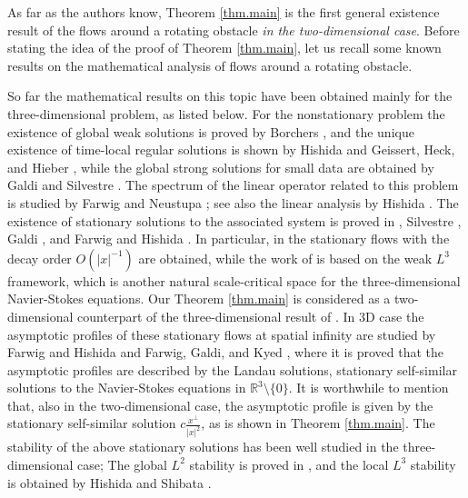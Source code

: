 \documentclass[11pt,a4paper]{article}
\newcommand{\R}{\mathbb{R}}
\begin{document}
As far as the authors know, Theorem \ref{thm.main} is the first general existence result of the flows around a rotating obstacle {\it in the two-dimensional case}.
Before stating the idea of the proof of Theorem \ref{thm.main}, 
let us recall some known results on the mathematical  analysis of flows around a rotating obstacle.


So far the mathematical results on this topic have been obtained mainly for the three-dimensional problem,
as listed below.
For the nonstationary problem the existence of global weak solutions is proved by Borchers \cite{Bo}, and the unique existence of time-local regular solutions is shown by Hishida \cite{H1} and Geissert, Heck, and Hieber \cite{GHH}, while the global strong solutions for small data are obtained by Galdi and Silvestre \cite{GSi}. The spectrum of the linear operator  related to this problem is studied by Farwig and Neustupa \cite{FN}; see also the linear analysis by Hishida \cite{H2}. The existence of stationary solutions to the associated system is proved in \cite{Bo}, Silvestre \cite{Si},  Galdi \cite{G1}, and Farwig and Hishida \cite{FH0}. In particular, in \cite{G1} the stationary flows with the decay order  $O(|x|^{-1})$ are obtained, while the work of \cite{FH0} is based on the weak $L^{3}$ framework, which is another natural scale-critical space for the three-dimensional Navier-Stokes equations. Our Theorem \ref{thm.main} is considered as a two-dimensional counterpart of the three-dimensional result of \cite{G1}.
In $3$D case the asymptotic profiles of these stationary flows at spatial infinity are studied by Farwig and Hishida \cite{FH1,FH2} and Farwig, Galdi, and Kyed \cite{FGK}, where it is proved that the asymptotic profiles are described by the Landau solutions, stationary self-similar solutions to the Navier-Stokes equations in 
$\R^3\setminus\{0\}$. 
It is worthwhile to mention that, also in the two-dimensional case,
the asymptotic profile is given by the stationary self-similar solution $c \frac{x^\bot}{|x|^2}$, 
as is shown in Theorem \ref{thm.main}.
The stability of the above stationary solutions has been well studied in the three-dimensional case;
The global $L^2$ stability is proved in \cite{GSi}, 
and the local $L^3$ stability is obtained by Hishida and Shibata \cite{HShi}.
\end{document}
